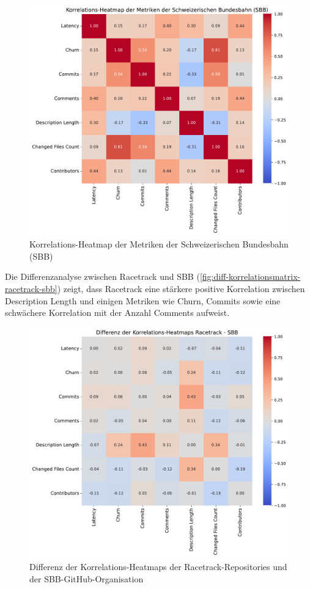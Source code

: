 \begin{figure}[htbp]
    \includegraphics[width=\textwidth]{Figures/sbb-korrelationsmatrix.pdf}
    \caption{Korrelations-Heatmap der Metriken der Schweizerischen Bundesbahn (SBB)}
    \label{fig:korrelationsmatrix-sbb}
\end{figure}


Die Differenzanalyse zwischen Racetrack und SBB (\autoref{fig:diff-korrelationsmatrix-racetrack-sbb}) zeigt, dass Racetrack eine stärkere positive Korrelation zwischen Description Length und einigen Metriken wie Churn, Commits sowie eine schwächere Korrelation mit der Anzahl Comments aufweist.

\begin{figure}[htbp]
\includegraphics[width=\textwidth]{Figures/diff-korrelationsmatrix-racetrack-sbb.pdf}
\caption{Differenz der Korrelations-Heatmaps der Racetrack-Repositories und der SBB-GitHub-Organisation}
\label{fig:diff-korrelationsmatrix-racetrack-sbb}
\end{figure}



